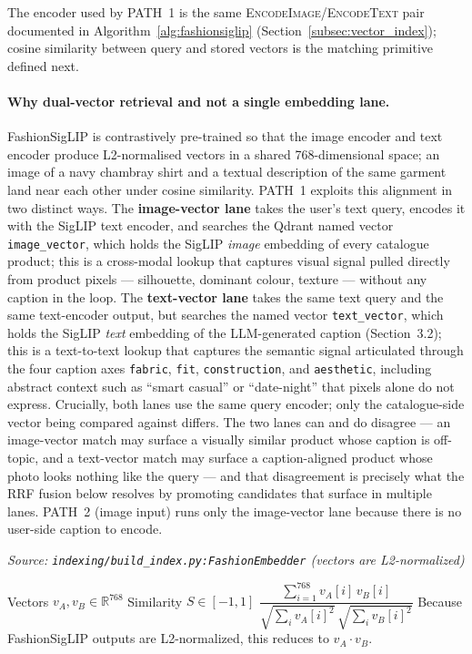 The encoder used by PATH~1 is the same \textsc{EncodeImage}/\textsc{EncodeText} pair documented in Algorithm~\ref{alg:fashionsiglip} (Section~\ref{subsec:vector_index}); cosine similarity between query and stored vectors is the matching primitive defined next.

\paragraph{Why dual-vector retrieval and not a single embedding lane.}
FashionSigLIP is contrastively pre-trained so that the image encoder and text encoder produce L2-normalised vectors in a shared 768-dimensional space; an image of a navy chambray shirt and a textual description of the same garment land near each other under cosine similarity. PATH~1 exploits this alignment in two distinct ways. The \textbf{image-vector lane} takes the user's text query, encodes it with the SigLIP text encoder, and searches the Qdrant named vector \texttt{image\_vector}, which holds the SigLIP \emph{image} embedding of every catalogue product; this is a cross-modal lookup that captures visual signal pulled directly from product pixels --- silhouette, dominant colour, texture --- without any caption in the loop. The \textbf{text-vector lane} takes the same text query and the same text-encoder output, but searches the named vector \texttt{text\_vector}, which holds the SigLIP \emph{text} embedding of the LLM-generated caption (Section~3.2); this is a text-to-text lookup that captures the semantic signal articulated through the four caption axes \texttt{fabric}, \texttt{fit}, \texttt{construction}, and \texttt{aesthetic}, including abstract context such as ``smart casual'' or ``date-night'' that pixels alone do not express. Crucially, both lanes use the same query encoder; only the catalogue-side vector being compared against differs. The two lanes can and do disagree --- an image-vector match may surface a visually similar product whose caption is off-topic, and a text-vector match may surface a caption-aligned product whose photo looks nothing like the query --- and that disagreement is precisely what the RRF fusion below resolves by promoting candidates that surface in multiple lanes. PATH~2 (image input) runs only the image-vector lane because there is no user-side caption to encode.

\begin{algorithm}[H]
\caption{Cosine Similarity for Cross-Modal Matching}\label{alg:cosine_sim}
\textit{Source: \texttt{indexing/build\_index.py:FashionEmbedder} (vectors are L2-normalized)}
\begin{algorithmic}[1]
\Require Vectors $v_A, v_B \in \mathbb{R}^{768}$
\Ensure Similarity $S \in [-1, 1]$
    \State \Return $\dfrac{\sum_{i=1}^{768} v_A[i]\,v_B[i]}{\sqrt{\sum_i v_A[i]^2}\,\sqrt{\sum_i v_B[i]^2}}$
\EndFunction
\State Because FashionSigLIP outputs are L2-normalized, this reduces to $v_A \cdot v_B$.
\end{algorithmic}
\end{algorithm}

